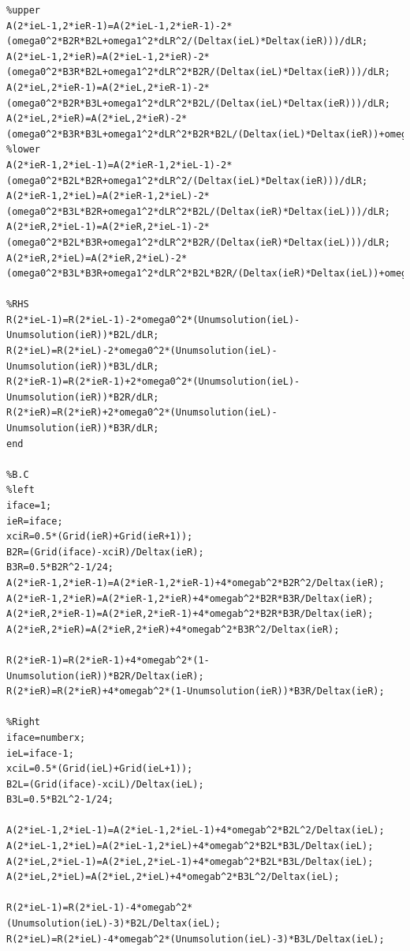 \documentclass[a4paper,11pt,UTF8]{article}%
\theoremstyle{plain}
\begin{document}
\begin{lstlisting}
%upper
A(2*ieL-1,2*ieR-1)=A(2*ieL-1,2*ieR-1)-2*(omega0^2*B2R*B2L+omega1^2*dLR^2/(Deltax(ieL)*Deltax(ieR)))/dLR;
A(2*ieL-1,2*ieR)=A(2*ieL-1,2*ieR)-2*(omega0^2*B3R*B2L+omega1^2*dLR^2*B2R/(Deltax(ieL)*Deltax(ieR)))/dLR;
A(2*ieL,2*ieR-1)=A(2*ieL,2*ieR-1)-2*(omega0^2*B2R*B3L+omega1^2*dLR^2*B2L/(Deltax(ieL)*Deltax(ieR)))/dLR;
A(2*ieL,2*ieR)=A(2*ieL,2*ieR)-2*(omega0^2*B3R*B3L+omega1^2*dLR^2*B2R*B2L/(Deltax(ieL)*Deltax(ieR))+omega2^2*dLR^4/(Deltax(ieL)^2*Deltax(ieR)^2))/dLR;
%lower
A(2*ieR-1,2*ieL-1)=A(2*ieR-1,2*ieL-1)-2*(omega0^2*B2L*B2R+omega1^2*dLR^2/(Deltax(ieL)*Deltax(ieR)))/dLR;
A(2*ieR-1,2*ieL)=A(2*ieR-1,2*ieL)-2*(omega0^2*B3L*B2R+omega1^2*dLR^2*B2L/(Deltax(ieR)*Deltax(ieL)))/dLR;
A(2*ieR,2*ieL-1)=A(2*ieR,2*ieL-1)-2*(omega0^2*B2L*B3R+omega1^2*dLR^2*B2R/(Deltax(ieR)*Deltax(ieL)))/dLR;
A(2*ieR,2*ieL)=A(2*ieR,2*ieL)-2*(omega0^2*B3L*B3R+omega1^2*dLR^2*B2L*B2R/(Deltax(ieR)*Deltax(ieL))+omega2^2*dLR^4/(Deltax(ieR)^2*Deltax(ieL)^2))/dLR;

%RHS
R(2*ieL-1)=R(2*ieL-1)-2*omega0^2*(Unumsolution(ieL)-Unumsolution(ieR))*B2L/dLR;
R(2*ieL)=R(2*ieL)-2*omega0^2*(Unumsolution(ieL)-Unumsolution(ieR))*B3L/dLR;
R(2*ieR-1)=R(2*ieR-1)+2*omega0^2*(Unumsolution(ieL)-Unumsolution(ieR))*B2R/dLR;
R(2*ieR)=R(2*ieR)+2*omega0^2*(Unumsolution(ieL)-Unumsolution(ieR))*B3R/dLR;    
end

%B.C
%left
iface=1;
ieR=iface;
xciR=0.5*(Grid(ieR)+Grid(ieR+1));
B2R=(Grid(iface)-xciR)/Deltax(ieR);
B3R=0.5*B2R^2-1/24;
A(2*ieR-1,2*ieR-1)=A(2*ieR-1,2*ieR-1)+4*omegab^2*B2R^2/Deltax(ieR);
A(2*ieR-1,2*ieR)=A(2*ieR-1,2*ieR)+4*omegab^2*B2R*B3R/Deltax(ieR);
A(2*ieR,2*ieR-1)=A(2*ieR,2*ieR-1)+4*omegab^2*B2R*B3R/Deltax(ieR);
A(2*ieR,2*ieR)=A(2*ieR,2*ieR)+4*omegab^2*B3R^2/Deltax(ieR);

R(2*ieR-1)=R(2*ieR-1)+4*omegab^2*(1-Unumsolution(ieR))*B2R/Deltax(ieR);
R(2*ieR)=R(2*ieR)+4*omegab^2*(1-Unumsolution(ieR))*B3R/Deltax(ieR);  

%Right
iface=numberx;
ieL=iface-1;
xciL=0.5*(Grid(ieL)+Grid(ieL+1));
B2L=(Grid(iface)-xciL)/Deltax(ieL);
B3L=0.5*B2L^2-1/24;

A(2*ieL-1,2*ieL-1)=A(2*ieL-1,2*ieL-1)+4*omegab^2*B2L^2/Deltax(ieL);
A(2*ieL-1,2*ieL)=A(2*ieL-1,2*ieL)+4*omegab^2*B2L*B3L/Deltax(ieL);
A(2*ieL,2*ieL-1)=A(2*ieL,2*ieL-1)+4*omegab^2*B2L*B3L/Deltax(ieL);
A(2*ieL,2*ieL)=A(2*ieL,2*ieL)+4*omegab^2*B3L^2/Deltax(ieL);

R(2*ieL-1)=R(2*ieL-1)-4*omegab^2*(Unumsolution(ieL)-3)*B2L/Deltax(ieL);
R(2*ieL)=R(2*ieL)-4*omegab^2*(Unumsolution(ieL)-3)*B3L/Deltax(ieL);




\end{lstlisting}
\end{document}
